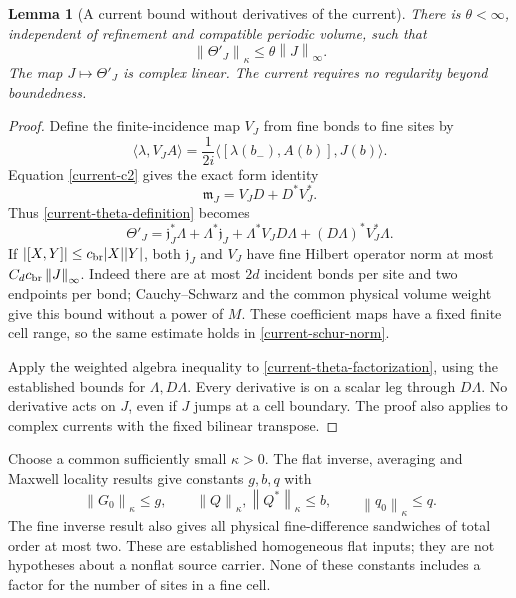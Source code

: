 \documentclass[11pt]{article}
\newtheorem{lemma}[theorem]{Lemma}
\theoremstyle{remark}
\newcommand{\norm}[1]{\left\|#1\right\|}
\begin{document}
\begin{lemma}[A current bound without derivatives of the current]
\label{current-theta-bound}
There is $\theta<\infty$, independent of refinement and compatible
periodic volume, such that
\begin{equation}
 \norm{\Theta'_J}_\kappa\le\theta\norm{J}_\infty.
 \label{current-theta-norm}
\end{equation}
The map $J\mapsto\Theta'_J$ is complex linear. The current requires no
regularity beyond boundedness.
\end{lemma}

\begin{proof}
Define the finite-incidence map $V_J$ from fine bonds to fine sites by
\[
 \langle\lambda,V_J A\rangle
   =\frac{1}{2i}\langle[\lambda(b_-),A(b)],J(b)\rangle.
\]
Equation \eqref{current-c2} gives the exact form identity
\[
 \mathfrak m_J=V_JD+D^*V_J^*.
\]
Thus \eqref{current-theta-definition} becomes
\begin{equation}
 \Theta'_J=
 \mathfrak j_J^*\Lambda+\Lambda^*\mathfrak j_J
 +\Lambda^*V_JD\Lambda+(D\Lambda)^*V_J^*\Lambda.
 \label{current-theta-factorization}
\end{equation}
If $|[X,Y]|\le c_{\rm br}|X||Y|$, both
$\mathfrak j_J$ and $V_J$ have fine Hilbert operator norm at most
$C_d c_{\rm br}\norm{J}_\infty$. Indeed there are at most $2d$
incident bonds per site and two endpoints per bond; Cauchy--Schwarz
and the common physical volume weight give this bound without a
power of $M$. These coefficient maps have a fixed finite cell range,
so the same estimate holds in \eqref{current-schur-norm}.

Apply the weighted algebra inequality to
\eqref{current-theta-factorization}, using the established bounds for
$\Lambda,D\Lambda$. Every derivative is on a scalar leg through
$D\Lambda$. No derivative acts on $J$, even if $J$ jumps at a cell
boundary. The proof also applies to complex currents with the fixed
bilinear transpose.
\end{proof}

Choose a common sufficiently small $\kappa>0$. The flat inverse,
averaging and Maxwell locality results give constants $g,b,q$ with
\begin{equation}
 \norm{G_0}_\kappa\le g,
 \qquad \norm{Q}_\kappa,\norm{Q^*}_\kappa\le b,
 \qquad \norm{q_0}_\kappa\le q.
 \label{current-input-bounds}
\end{equation}
The fine inverse result also gives all physical fine-difference
sandwiches of total order at most two. These are established
homogeneous flat inputs; they are not hypotheses about a nonflat
source carrier. None of these constants includes a factor for the
number of sites in a fine cell.
\end{document}
